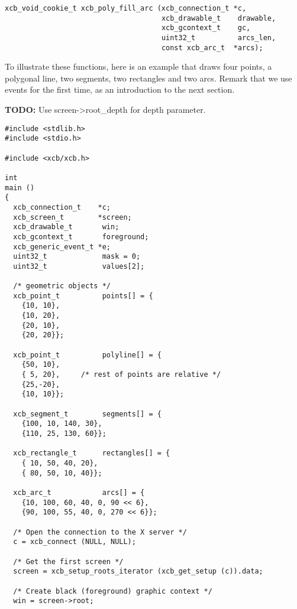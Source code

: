 \documentclass[12pt,oneside,titlepage]{book}
\begin{document}
\begin{enumerate}
\begin{enumerate}
\begin{verbatim}
xcb_void_cookie_t xcb_poly_fill_arc (xcb_connection_t *c,
                                     xcb_drawable_t    drawable,
                                     xcb_gcontext_t    gc,
                                     uint32_t          arcs_len,
                                     const xcb_arc_t  *arcs);
\end{verbatim}

    \hfill\break
    \protect\hypertarget{points.c}{}{}

    To illustrate these functions, here is an example that draws four
    points, a polygonal line, two segments, two rectangles and two arcs.
    Remark that we use events for the first time, as an introduction to
    the next section.

    \textbf{TODO:} Use screen-\textgreater root\_depth for depth
    parameter.

\begin{verbatim}
#include <stdlib.h>
#include <stdio.h>

#include <xcb/xcb.h>

int
main ()
{
  xcb_connection_t    *c;
  xcb_screen_t        *screen;
  xcb_drawable_t       win;
  xcb_gcontext_t       foreground;
  xcb_generic_event_t *e;
  uint32_t             mask = 0;
  uint32_t             values[2];

  /* geometric objects */
  xcb_point_t          points[] = {
    {10, 10},
    {10, 20},
    {20, 10},
    {20, 20}};

  xcb_point_t          polyline[] = {
    {50, 10},
    { 5, 20},     /* rest of points are relative */
    {25,-20},
    {10, 10}};

  xcb_segment_t        segments[] = {
    {100, 10, 140, 30},
    {110, 25, 130, 60}};

  xcb_rectangle_t      rectangles[] = {
    { 10, 50, 40, 20},
    { 80, 50, 10, 40}};

  xcb_arc_t            arcs[] = {
    {10, 100, 60, 40, 0, 90 << 6},
    {90, 100, 55, 40, 0, 270 << 6}};

  /* Open the connection to the X server */
  c = xcb_connect (NULL, NULL);

  /* Get the first screen */
  screen = xcb_setup_roots_iterator (xcb_get_setup (c)).data;

  /* Create black (foreground) graphic context */
  win = screen->root;


\end{verbatim}
\end{enumerate}
\end{enumerate}
\end{document}
